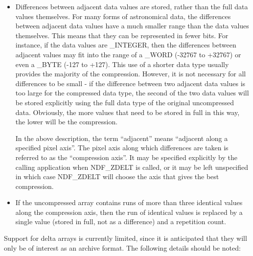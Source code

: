 \documentclass[twoside,11pt,nolof]{starlink}
\begin{document}
\begin{itemize}

\item Differences between adjacent data values are stored, rather than
the full data values themselves. For many forms of astronomical data, the
differences between adjacent data values have a much smaller range than
the data values themselves. This means that they can be represented in
fewer bits. For instance, if the data values are \_INTEGER, then the
differences between adjacent values may fit into the range of a \_WORD
(-32767 to +32767) or even a \_BYTE (-127 to +127). This use of a shorter
data type usually provides the majority of the compression. However, it is not
necessary for all differences to be small - if the difference between two
adjacent data values is too large for the compressed data type, the
second of the two data values will be stored explicitly using the full data
type of the original uncompressed data. Obviously, the more values that
need to be stored in full in this way, the lower will be the compression.

In the above description, the term ``adjacent'' means ``adjacent along a
specified pixel axis''. The pixel axis along which differences are taken
is referred to as the ``compression axis''. It may be specified
explicitly by the calling application when NDF\_ZDELT is called, or it
may be left unspecified in which case NDF\_ZDELT will choose the axis that
gives the best compression.

\item If the uncompressed array contains runs of more than three identical
values along the compression axis, then the run of identical values is
replaced by a single value (stored in full, not as a difference) and a
repetition count.

\end{itemize}

Support for delta arrays is currently limited, since it is anticipated
that they will only be of interest as an archive format. The following
details should be noted:
\end{document}
